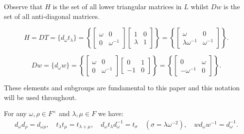 Observe that $H$ is the set of all lower triangular matrices in $L$ whilst $Dw$ is the set of all anti-diagonal matrices.

\begin{equation} \label{Hlowertri} H = DT =  \{d_\omega t_\lambda\} = \left\{ \begin{bmatrix} \omega & 0 \\ 0 & \omega^{-1} \end{bmatrix} \begin{bmatrix} 1 & 0 \\ \lambda & 1 \end{bmatrix} \right\} = \left\{ \begin{bmatrix} \omega & 0 \\ \lambda \omega^{-1} & \omega^{-1} \end{bmatrix}  \right\}. \end{equation}

\begin{equation} \label{antidiag} Dw = \{ d_\omega w \} =  \left\{  \begin{bmatrix} \omega & 0 \\ 0 & \omega^{-1} \end{bmatrix} \begin{bmatrix} 0 & 1 \\ -1 & 0 \end{bmatrix} \right\} = \left\{ \begin{bmatrix} 0 & \omega \\ -\omega^{-1} & 0 \end{bmatrix}  \right\}. \end{equation}

These elements and subgroups are fundamental to this paper and this notation will be used throughout.

\begin{lemma}\label{6.1}
For any $\omega, \rho \in F^\times$ and $\lambda, \mu \in F$ we have:
\begin{align*} d_\omega d_{\rho}= d_{\omega\rho}, \quad t_\lambda t_\mu = t_{\lambda + \mu}, \quad d_\omega t_\lambda d^{-1}_\omega = t_\sigma \quad \! \! (\sigma=\lambda \omega^{-2}), \quad w d_\omega w^{-1} = d^{-1}_\omega.
\end{align*} 
\end{lemma}
\vspace{0mm}

